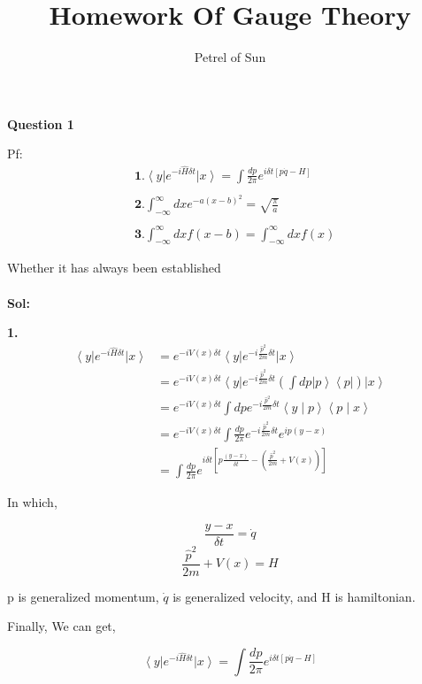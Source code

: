 \documentclass[a4paper]{article}
\title{\textbf{Homework Of Gauge Theory}}
\author{Petrel of Sun}
\date{}
\begin{document}
\maketitle

\noindent \textbf{Question 1}
\par Pf:
\begin{align}
    &\textbf{1.}\left< y \right|e^{-i\hat{H}\delta t}\left| x \right> =\int{\frac{dp}{2\pi}e^{i\delta t[p\dot{q}-H]}}\\\nonumber
    \\ 
    &\textbf{2.}\int_{-\infty}^{\infty}{dxe^{-a(x-b)^2}}
    =\sqrt{\frac{\pi}{a}}\\\nonumber
    \\ 
    &\textbf{3.}\int_{-\infty}^{\infty}{dxf(x-b)}
    =\int_{-\infty}^{\infty}{dxf(x)}
\end{align}
\par
Whether it has always been established
\\ \\
\textbf{Sol:}
\par\textbf{1.}
\begin{equation}
    \begin{split}
       \left< y \right|e^{-i\hat{H}\delta t}\left| x \right> 
       &=e^{-iV(x)\delta t}\left<y\right|e^{-i\frac{\hat{p}^2}{2m}\delta t}\left| x \right> \\
       &=e^{-iV(x)\delta t}\left<y\right|e^{-i\frac{\hat{p}^2}{2m}\delta t}(\int{dp\left|p\right>\left<p\right|})\left| x \right> \\
       &=e^{-iV(x)\delta t}\int{dp e^{-i\frac{\hat{p}^2}{2m}\delta t}\left< y \mid p \right> \left< p \mid x \right>}\\
       &=e^{-iV(x)\delta t}\int{\frac{dp}{2\pi}e^{-i\frac{\hat{p}^2}{2m}\delta t}e^{ip(y-x)}}\\
       &=\int{\frac{dp}{2\pi}e^{i\delta t[p\frac{(y-x)}{\delta t}-(\frac{\hat{p}^2}{2m}+V(x))]}}
    \end{split}
\end{equation}
\par In which,
\par 
\begin{equation}
    \frac{y-x}{\delta t}=\dot{q}
\end{equation}
\begin{equation}
    \frac{\hat{p}^2}{2m}+V(x)=H
\end{equation}
\par p is generalized momentum, $\dot{q}$ is generalized velocity, and H is hamiltonian.
\par Finally, We can get,
\par \begin{equation}
     \left< y \right|e^{-i\hat{H}\delta t}\left| x \right> =\int{\frac{dp}{2\pi}e^{i\delta t[p\dot{q}-H]}}
\end{equation}
\end{document}
